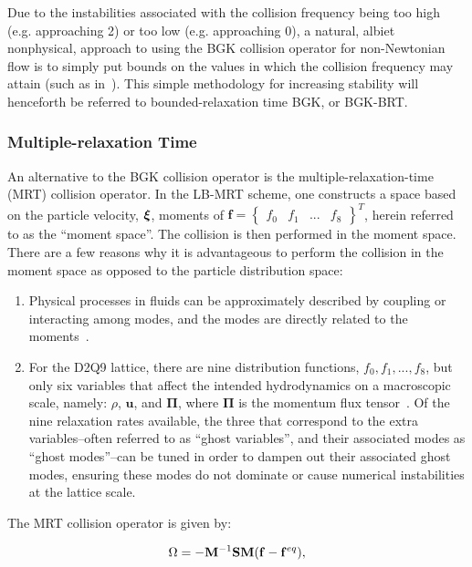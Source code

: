 Due to the instabilities associated with the collision frequency being too high (e.g. approaching 2) or too low (e.g. approaching 0), a natural, albiet nonphysical, approach to using the BGK collision operator for non-Newtonian flow is to simply put bounds on the values in which the collision frequency may attain (such as in~\citet{svec2011flow,svec2012free,gabbanelli2005lattice}).
This simple methodology for increasing stability will henceforth be referred to bounded-relaxation time BGK, or BGK-BRT.

\subsubsection{Multiple-relaxation Time}

An alternative to the BGK collision operator is the multiple-relaxation-time (MRT) collision operator.
In the LB-MRT scheme, one constructs a space based on the particle velocity, $\boldsymbol{\xi}$, moments of $\mathbf{f} = \begin{Bmatrix}f_0 & f_1 & ... & f_8\end{Bmatrix}^T$, herein referred to as the ``moment space''.
The collision is then performed in the moment space.
There are a few reasons why it is advantageous to perform the collision in the moment space as opposed to the particle distribution space:
\begin{enumerate}
    \item Physical processes in fluids can be approximately described by coupling or interacting among modes, and the modes are directly related to the moments~\cite{lallemand2000theory}.
    \item For the D2Q9 lattice, there are nine distribution functions, $f_0, f_1, ..., f_8$, but only six variables that affect the intended hydrodynamics on a macroscopic scale, namely: $\rho$, $\mathbf{u}$, and $\mathbf{\Pi}$, where $\mathbf{\Pi}$ is the momentum flux tensor~\cite{dellar2003incompressible}.
    Of the nine relaxation rates available, the three that correspond to the extra variables--often referred to as ``ghost variables'', and their associated modes as ``ghost modes''--can be tuned in order to dampen out their associated ghost modes, ensuring these modes do not dominate or cause numerical instabilities at the lattice scale.
\end{enumerate}

The MRT collision operator is given by:

\begin{equation} \label{eq:mrt-colop}
	\Omega = - {\mathbf{M}}^{-1} \mathbf{S} \mathbf{M} (\mathbf{f} - \mathbf{f}^{eq}),
\end{equation}

